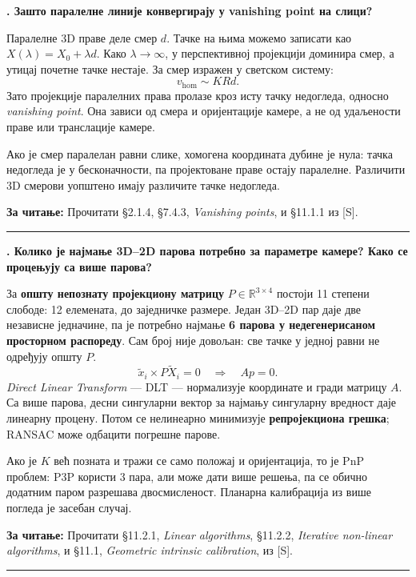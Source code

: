 \documentclass[10pt,a4paper]{article}
\newcommand{\en}[1]{\textit{#1}}
\newcounter{pitanje}
\newenvironment{odgovor}[1]{\stepcounter{pitanje}\begin{minipage}[t][0.455\textheight][t]{\textwidth}\vspace{0pt}\textbf{\thepitanje. #1}\par\smallskip}{\end{minipage}\par\ifodd\value{pitanje}\vspace{0.025\textheight}\hrule\vspace{0.015\textheight}\else\newpage\fi}
\newcommand{\izvor}[1]{\par\vfill{\footnotesize\textbf{За читање:} #1}\par}
\begin{document}
\begin{odgovor}{Зашто паралелне линије конвергирају у vanishing point на слици?}
Паралелне 3D праве деле смер $d$. Тачке на њима можемо записати као $X(\lambda)=X_0+\lambda d$. Како $\lambda\to\infty$, у перспективној пројекцији доминира смер, а утицај почетне тачке нестаје. За смер изражен у светском систему:
\[
v_{\mathrm{hom}}\sim KRd.
\]
Зато пројекције паралелних права пролазе кроз исту тачку недогледа, односно \en{vanishing point}. Она зависи од смера и оријентације камере, а не од удаљености праве или транслације камере.
\begin{center}\end{center}
Ако је смер паралелан равни слике, хомогена координата дубине је нула: тачка недогледа је у бесконачности, па пројектоване праве остају паралелне. Различити 3D смерови уопштено имају различите тачке недогледа.
\izvor{Прочитати §2.1.4, §7.4.3, \en{Vanishing points}, и §11.1.1 из [S].}
\end{odgovor}

\begin{odgovor}{Колико је најмање 3D--2D парова потребно за параметре камере? Како се процењују са више парова?}
За \textbf{општу непознату пројекциону матрицу} $P\in\mathbb R^{3\times4}$ постоји 11 степени слободе: 12 елемената, до заједничке размере. Један 3D--2D пар даје две независне једначине, па је потребно најмање \textbf{6 парова у недегенерисаном просторном распореду}. Сам број није довољан: све тачке у једној равни не одређују општу $P$.
\[
\widetilde x_i\times P\widetilde X_i=0
\quad\Longrightarrow\quad Ap=0.
\]
\en{Direct Linear Transform} — DLT — нормализује координате и гради матрицу $A$. Са више парова, десни сингуларни вектор за најмању сингуларну вредност даје линеарну процену. Потом се нелинеарно минимизује \textbf{репројекциона грешка}; RANSAC може одбацити погрешне парове.

Ако је $K$ већ позната и тражи се само положај и оријентација, то је PnP проблем: P3P користи 3 пара, али може дати више решења, па се обично додатним паром разрешава двосмисленост. Планарна калибрација из више погледа је засебан случај.
\izvor{Прочитати §11.2.1, \en{Linear algorithms}, §11.2.2, \en{Iterative non-linear algorithms}, и §11.1, \en{Geometric intrinsic calibration}, из [S].}
\end{odgovor}
\end{document}

